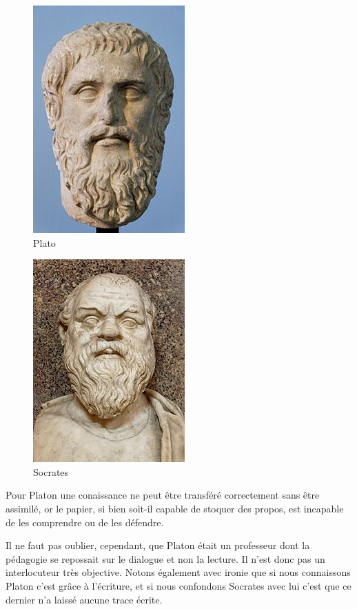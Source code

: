 \begin{minipage}[H]{0.49\linewidth}
  \begin{figure}[H]
  \centering
  \includegraphics[height=0.15\paperheight]{../resources/illustrations/plato2}
  \caption{Plato}
  \end{figure}
\end{minipage}
\begin{minipage}[H]{0.49\linewidth}
  \begin{figure}[H]
  \centering
  \includegraphics[height=0.15\paperheight]{../resources/illustrations/socrates}
  \caption{Socrates}
  \end{figure}
\end{minipage}

Pour Platon une conaissance ne peut être transféré correctement sans être assimilé, or le papier, si bien soit-il capable de stoquer des propos, est incapable de les comprendre ou de les défendre.

Il ne faut pas oublier, cependant, que Platon était un professeur dont la pédagogie se repossait sur le dialogue et non la lecture. Il n'est donc pas un interlocuteur très objective. Notons également avec ironie que si nous connaissons Platon c'est grâce à l'écriture, et si nous confondons Socrates avec lui c'est que ce dernier n'a laissé aucune trace écrite.

